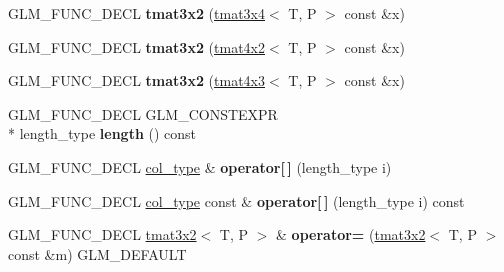 \begin{DoxyCompactItemize}
\item 
\hypertarget{structglm_1_1tmat3x2_abb723692051c3f23f9a56db9664b4397}{G\-L\-M\-\_\-\-F\-U\-N\-C\-\_\-\-D\-E\-C\-L {\bfseries tmat3x2} (\hyperlink{structglm_1_1tmat3x4}{tmat3x4}$<$ T, P $>$ const \&x)}\label{structglm_1_1tmat3x2_abb723692051c3f23f9a56db9664b4397}

\item 
\hypertarget{structglm_1_1tmat3x2_a1c2b547c2c8757370be1f8fdee7a91bb}{G\-L\-M\-\_\-\-F\-U\-N\-C\-\_\-\-D\-E\-C\-L {\bfseries tmat3x2} (\hyperlink{structglm_1_1tmat4x2}{tmat4x2}$<$ T, P $>$ const \&x)}\label{structglm_1_1tmat3x2_a1c2b547c2c8757370be1f8fdee7a91bb}

\item 
\hypertarget{structglm_1_1tmat3x2_a6dbf2ea0b45902cb17b025111afcedb7}{G\-L\-M\-\_\-\-F\-U\-N\-C\-\_\-\-D\-E\-C\-L {\bfseries tmat3x2} (\hyperlink{structglm_1_1tmat4x3}{tmat4x3}$<$ T, P $>$ const \&x)}\label{structglm_1_1tmat3x2_a6dbf2ea0b45902cb17b025111afcedb7}

\item 
\hypertarget{structglm_1_1tmat3x2_a65f1e36e43b3763ddd3e8d46270c6f5d}{G\-L\-M\-\_\-\-F\-U\-N\-C\-\_\-\-D\-E\-C\-L G\-L\-M\-\_\-\-C\-O\-N\-S\-T\-E\-X\-P\-R \\*
length\-\_\-type {\bfseries length} () const }\label{structglm_1_1tmat3x2_a65f1e36e43b3763ddd3e8d46270c6f5d}

\item 
\hypertarget{structglm_1_1tmat3x2_a7bf6dec8837ea7b18163629c1fdf60bb}{G\-L\-M\-\_\-\-F\-U\-N\-C\-\_\-\-D\-E\-C\-L \hyperlink{structglm_1_1tvec2}{col\-\_\-type} \& {\bfseries operator\mbox{[}$\,$\mbox{]}} (length\-\_\-type i)}\label{structglm_1_1tmat3x2_a7bf6dec8837ea7b18163629c1fdf60bb}

\item 
\hypertarget{structglm_1_1tmat3x2_a740f9c3e07d2c076a94efb25e69aec0d}{G\-L\-M\-\_\-\-F\-U\-N\-C\-\_\-\-D\-E\-C\-L \hyperlink{structglm_1_1tvec2}{col\-\_\-type} const \& {\bfseries operator\mbox{[}$\,$\mbox{]}} (length\-\_\-type i) const }\label{structglm_1_1tmat3x2_a740f9c3e07d2c076a94efb25e69aec0d}

\item 
\hypertarget{structglm_1_1tmat3x2_a895a8e6ea3d1206f000e6b298ba56410}{G\-L\-M\-\_\-\-F\-U\-N\-C\-\_\-\-D\-E\-C\-L \hyperlink{structglm_1_1tmat3x2}{tmat3x2}$<$ T, P $>$ \& {\bfseries operator=} (\hyperlink{structglm_1_1tmat3x2}{tmat3x2}$<$ T, P $>$ const \&m) G\-L\-M\-\_\-\-D\-E\-F\-A\-U\-L\-T}\label{structglm_1_1tmat3x2_a895a8e6ea3d1206f000e6b298ba56410}


\end{DoxyCompactItemize}
